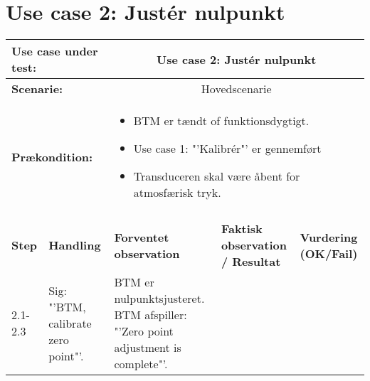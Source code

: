 \section{Use case 2: Justér nulpunkt}
\begin{tabular}{|p{1cm}|p{3cm}|p{4cm}|p{4cm}|p{2cm}|}
\hline
\multicolumn{2}{|p{3cm}|}{\textbf{Use case under test:}} & \multicolumn{3}{c|}{Use case 2: Justér nulpunkt} \\\hline

\multicolumn{2}{|p{3cm}|}{\textbf{Scenarie:}} & \multicolumn{3}{c|}{Hovedscenarie} \\\hline

\multicolumn{2}{|p{3cm}|}{\textbf{Prækondition:}}  & \multicolumn{3}{l|}{\parbox{0.6\textwidth}{
\begin{itemize}[label=$\circ$]
\item BTM er tændt of funktionsdygtigt.
\item Use case 1: "'Kalibrér"' er gennemført
\item Transduceren skal være åbent for atmosfærisk tryk.  
\end{itemize} }}\\\hline

\multicolumn{5}{|c|}{} \\\hline

\textbf{Step} & \textbf{Handling} & \textbf{Forventet observation} & \textbf{Faktisk observation / Resultat} & \textbf{Vurdering (OK/Fail)}\\\hline

2.1-2.3 & Sig: "'BTM, calibrate zero point"'. & BTM er nulpunktsjusteret. BTM afspiller: "'Zero point adjustment is complete"'. &  & \\\hline

\end{tabular}



